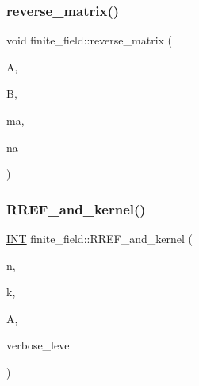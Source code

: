 \mbox{\label{classfinite__field_ae35983c950a46b33d35106e9163a86ba}} 
\subsubsection{\texorpdfstring{reverse\+\_\+matrix()}{reverse\_matrix()}}
{\footnotesize\ttfamily void finite\+\_\+field\+::reverse\+\_\+matrix (\begin{DoxyParamCaption}\item[{\mbox{\hyperlink{galois_8h_a09fddde158a3a20bd2dcadb609de11dc}{I\+NT}} $\ast$}]{A,  }\item[{\mbox{\hyperlink{galois_8h_a09fddde158a3a20bd2dcadb609de11dc}{I\+NT}} $\ast$}]{B,  }\item[{\mbox{\hyperlink{galois_8h_a09fddde158a3a20bd2dcadb609de11dc}{I\+NT}}}]{ma,  }\item[{\mbox{\hyperlink{galois_8h_a09fddde158a3a20bd2dcadb609de11dc}{I\+NT}}}]{na }\end{DoxyParamCaption})}

\mbox{\label{classfinite__field_afdf51a97d36ccddcf8f9f969c3a10ed8}} 
\subsubsection{\texorpdfstring{R\+R\+E\+F\+\_\+and\+\_\+kernel()}{RREF\_and\_kernel()}}
{\footnotesize\ttfamily \mbox{\hyperlink{galois_8h_a09fddde158a3a20bd2dcadb609de11dc}{I\+NT}} finite\+\_\+field\+::\+R\+R\+E\+F\+\_\+and\+\_\+kernel (\begin{DoxyParamCaption}\item[{\mbox{\hyperlink{galois_8h_a09fddde158a3a20bd2dcadb609de11dc}{I\+NT}}}]{n,  }\item[{\mbox{\hyperlink{galois_8h_a09fddde158a3a20bd2dcadb609de11dc}{I\+NT}}}]{k,  }\item[{\mbox{\hyperlink{galois_8h_a09fddde158a3a20bd2dcadb609de11dc}{I\+NT}} $\ast$}]{A,  }\item[{\mbox{\hyperlink{galois_8h_a09fddde158a3a20bd2dcadb609de11dc}{I\+NT}}}]{verbose\+\_\+level }\end{DoxyParamCaption})}

